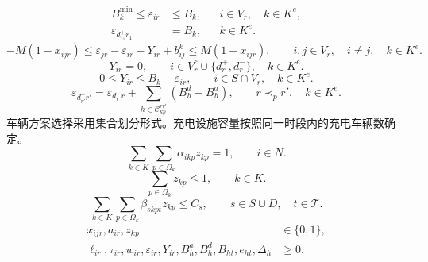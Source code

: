 \begin{equation}
\begin{aligned}
B_k^{\min}\le\varepsilon_{ir}&\le B_k,
&&i\in V_r,\quad k\in K^{e},\\
\varepsilon_{d_{r_1}^{+}r_1}&=B_k,
&&k\in K^{e}.
\end{aligned}
\label{eq:unified-battery-bound}
\end{equation}
\begin{equation}
-M(1-x_{ijr})
\le\varepsilon_{jr}-\varepsilon_{ir}-Y_{ir}+b_{ij}^{k}
\le M(1-x_{ijr}),
\qquad i,j\in V_r,\quad i\ne j,\quad k\in K^{e}.
\label{eq:unified-battery-propagation}
\end{equation}
\begin{equation}
Y_{ir}=0,
\qquad i\in V_r^{c}\cup\{d_r^{+},d_r^{-}\},\quad k\in K^{e}.
\label{eq:unified-no-customer-charge}
\end{equation}
\begin{equation}
0\le Y_{ir}\le B_k-\varepsilon_{ir},
\qquad i\in S\cap V_r,\quad k\in K^{e}.
\label{eq:unified-charge-bound}
\end{equation}
\begin{equation}
\varepsilon_{d_{r'}^{+}r'}
=\varepsilon_{d_r^{-}r}
+\sum_{h\in\mathcal C_{kp}^{rr'}}(B_h^{d}-B_h^{a}),
\qquad r\prec_p r',\quad k\in K^{e}.
\label{eq:unified-trip-link-energy}
\end{equation}
车辆方案选择采用集合划分形式\cite{ref:sahin}。充电设施容量按照同一时段内的充电车辆数确定\cite{ref:12}。
\begin{equation}
\sum_{k\in K}\sum_{p\in\Omega_k}\alpha_{ikp}z_{kp}=1,
\qquad i\in N .
\label{eq:unified-coverage}
\end{equation}
\begin{equation}
\sum_{p\in\Omega_k}z_{kp}\le1,
\qquad k\in K .
\label{eq:unified-vehicle}
\end{equation}
\begin{equation}
\sum_{k\in K}\sum_{p\in\Omega_k}\beta_{skpt}z_{kp}\le C_s,
\qquad s\in S\cup D,\quad t\in\mathcal T .
\label{eq:unified-station}
\end{equation}
\begin{equation}
\begin{aligned}
x_{ijr},a_{ir},z_{kp}&\in\{0,1\},\\
\ell_{ir},\tau_{ir},w_{ir},\varepsilon_{ir},Y_{ir},
B_h^{a},B_h^{d},B_{ht},e_{ht},\Delta_h&\ge0 .
\end{aligned}
\label{eq:unified-domain}
\end{equation}

